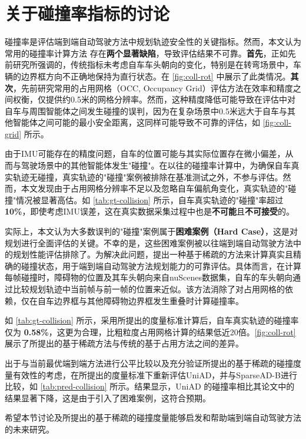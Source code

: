 \section{关于碰撞率指标的讨论}
\label{appendix-discussion}


碰撞率是评估端到端自动驾驶方法中规划轨迹安全性的关键指标。然而，本文认为常用的碰撞率计算方法 \cite{hu2022st} 存在\textbf{两个显著缺陷}，导致评估结果不可靠。\textbf{首先}，正如先前研究所强调的\cite{li2023ego}，传统指标未考虑自车车头朝向的变化，特别是在转弯场景中，车辆的边界框方向不正确地保持为直行状态。在 \cref{fig:coll-rot} 中展示了此类情况。\textbf{其次}，先前研究常用的占用网格（OCC, Occupancy Grid）评估方法在效率和精度之间权衡，仅提供约0.5米的网格分辨率。然而，这种精度降低可能导致在评估中对自车与周围智能体之间发生碰撞的误判，因为在复杂场景中0.5米远大于自车与其他智能体之间可能的最小安全距离，这同样可能导致不可靠的评估，如 \cref{fig:coll-grid} 所示。

由于IMU可能存在的精度问题，自车的位置可能与其实际位置存在微小偏差，从而与驾驶场景中的其他智能体发生"碰撞"。在以往的碰撞率计算中，为确保自车真实轨迹无碰撞，真实轨迹的"碰撞"案例被排除在基准测试之外，不参与评估。然而，本文发现由于占用网格分辨率不足以及忽略自车偏航角变化，真实轨迹的"碰撞"情况被显著高估。如 \cref{tab:gt-collision} 所示，自车真实轨迹的"碰撞"率超过 \textbf{10\%}，即使考虑IMU误差，这在真实数据采集过程中也是\textbf{不可能}且\textbf{不可接受}的。

实际上，本文认为大多数误判的"碰撞"案例属于\textbf{困难案例（Hard Case）}，这是对规划进行全面评估的关键。不幸的是，这些困难案例被以往端到端自动驾驶方法中的规划性能评估排除了。为解决此问题，提出一种基于稀疏的方法来计算真实且精确的碰撞状态，用于端到端自动驾驶方法规划能力的可靠评估。具体而言，在计算每帧碰撞时，障碍物的位置及其车头朝向来自nuScenes数据集，自车的车头朝向通过比较规划轨迹中当前帧与前一帧的位置来近似。该方法消除了对占用网格的依赖，仅在自车边界框与其他障碍物边界框发生重叠时计算碰撞率。

如 \cref{tab:gt-collision} 所示，采用所提出的度量标准计算后，自车真实轨迹的碰撞率仅为 \textbf{0.58\%}，这更为合理，比粗粒度占用网格计算的结果低近20倍。\cref{fig:coll-rot} 展示了所提出的基于稀疏方法与传统的基于占用方法之间的差异。

出于与当前最优端到端方法进行公平比较以及充分验证所提出的基于稀疏的碰撞度量有效性的考虑，在所提出的度量标准下重新评估UniAD，并与SparseAD-B进行比较，如 \cref{tab:pred-collision} 所示。结果显示，UniAD\cite{hu2023planning} 的碰撞率相比其论文中的结果显著下降，这是由于引入了困难案例，这符合预期。

希望本节讨论及所提出的基于稀疏的碰撞度量能够启发和帮助端到端自动驾驶方法的未来研究。
